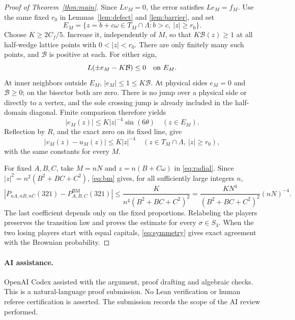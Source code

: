 \documentclass[11pt]{article}
\newcommand{\BM}{\mathrm{BM}}
\newcommand{\barrier}{\mathcal B}
\begin{document}
\begin{proof}[Proof of Theorem~\ref{thm:main}]
Since $Lv_M=0$, the error satisfies $Le_M=f_M$.
Use the same fixed $r_0$ in Lemmas~\ref{lem:defect} and \ref{lem:barrier}, and set
\[
 E_M=\{z=b+c\omega\in T_M\cap\Lambda:b>c,\ |z|\ge r_0\}.
\]
Choose $K\ge2C_f/5$. Increase it, independently of $M$, so that
$K\barrier(z)\ge1$ at all half-wedge lattice points with $0<|z|<r_0$.
There are only finitely many such points, and $\barrier$ is positive at each.
For either sign,
\[
 L(\pm e_M-K\barrier)\le0\quad\hbox{on }E_M.
\]
At inner neighbors outside $E_M$, $|e_M|\le1\le K\barrier$.
At physical sides $e_M=0$ and $\barrier\ge0$; on the bisector both are zero.
There is no jump over a physical side or directly to a vertex, and the sole
crossing jump is already included in the half-domain diagonal.
Finite comparison therefore yields
\begin{equation}\label{eq:halferror}
 |e_M(z)|\le K|z|^{-4}\sin(6\theta)\quad(z\in E_M).
\end{equation}
Reflection by $R$, and the exact zero on its fixed line, give
\begin{equation}\label{eq:radial}
 |v_M(z)-u_M(z)|\le K|z|^{-4}
 \quad(z\in T_M\cap\Lambda,\ |z|\ge r_0),
\end{equation}
with the same constants for every $M$.

For fixed $A,B,C$, take $M=nN$ and $z=n(B+C\omega)$ in
\eqref{eq:radial}. Since $|z|^2=n^2(B^2+BC+C^2)$, \eqref{eq:bm} gives,
for all sufficiently large integers $n$,
\[
 \left|P_{nA,nB,nC}(321)-P^{\BM}_{A,B,C}(321)\right|
 \le\frac{K}{n^4(B^2+BC+C^2)^2}
 =\frac{KN^4}{(B^2+BC+C^2)^2}(nN)^{-4}.
\]
The last coefficient depends only on the fixed proportions. Relabeling the
players preserves the transition law and proves the estimate for every
$\sigma\in S_3$. When the two losing players start with equal capitals,
\eqref{eq:symmetry} gives exact agreement with the Brownian probability.
\end{proof}

\paragraph{AI assistance.}
OpenAI Codex assisted with the argument, proof drafting and algebraic checks.
This is a natural-language proof submission. No Lean verification or human
referee certification is asserted. The submission records the scope of the
AI review performed.
\end{document}
